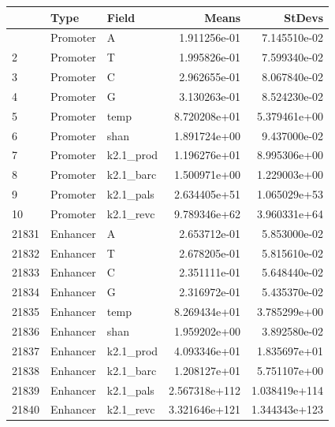 \documentclass[
  letterpaper,
  DIV=11,
  numbers=noendperiod]{scrartcl}
\begin{document}
\begin{longtable}[]{@{}lllrr@{}}
\toprule\noalign{}
& Type & Field & Means & StDevs \\
\midrule\noalign{}
\endhead
\bottomrule\noalign{}
\endlastfoot
1 & Promoter & A & 1.911256e-01 & 7.145510e-02 \\
2 & Promoter & T & 1.995826e-01 & 7.599340e-02 \\
3 & Promoter & C & 2.962655e-01 & 8.067840e-02 \\
4 & Promoter & G & 3.130263e-01 & 8.524230e-02 \\
5 & Promoter & temp & 8.720208e+01 & 5.379461e+00 \\
6 & Promoter & shan & 1.891724e+00 & 9.437000e-02 \\
7 & Promoter & k2.1\_prod & 1.196276e+01 & 8.995306e+00 \\
8 & Promoter & k2.1\_barc & 1.500971e+00 & 1.229003e+00 \\
9 & Promoter & k2.1\_pals & 2.634405e+51 & 1.065029e+53 \\
10 & Promoter & k2.1\_revc & 9.789346e+62 & 3.960331e+64 \\
21831 & Enhancer & A & 2.653712e-01 & 5.853000e-02 \\
21832 & Enhancer & T & 2.678205e-01 & 5.815610e-02 \\
21833 & Enhancer & C & 2.351111e-01 & 5.648440e-02 \\
21834 & Enhancer & G & 2.316972e-01 & 5.435370e-02 \\
21835 & Enhancer & temp & 8.269434e+01 & 3.785299e+00 \\
21836 & Enhancer & shan & 1.959202e+00 & 3.892580e-02 \\
21837 & Enhancer & k2.1\_prod & 4.093346e+01 & 1.835697e+01 \\
21838 & Enhancer & k2.1\_barc & 1.208127e+01 & 5.751107e+00 \\
21839 & Enhancer & k2.1\_pals & 2.567318e+112 & 1.038419e+114 \\
21840 & Enhancer & k2.1\_revc & 3.321646e+121 & 1.344343e+123 \\
\end{longtable}
\end{document}
